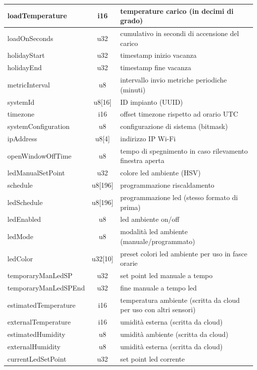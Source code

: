 \documentclass[12pt,a4paper,twoside,titlepage]{book}
\begin{document}
\begin{center}
\begin{longtable}{| p{5cm} | c | p{8cm} |}
    loadTemperature & i16 & temperature carico (in decimi di grado)\\ \hline
    loadOnSeconds & u32 & cumulativo in secondi di accensione del carico\\ \hline
    holidayStart & u32 & timestamp inizio vacanza\\ \hline
    holidayEnd & u32 & timestamp fine vacanza\\ \hline
    metricInterval & u8 & intervallo invio metriche periodiche (minuti)\\ \hline
    systemId & u8[16] & ID impianto (UUID)\\ \hline
    timezone & i16 & offset timezone rispetto ad orario UTC\\ \hline
    systemConfiguration & u8 & configurazione di sistema (bitmask)\\ \hline
    ipAddress & u8[4] & indirizzo IP Wi-Fi\\ \hline
    openWindowOffTime & u8 & tempo di spegnimento in caso rilevamento finestra aperta\\ \hline
    ledManualSetPoint & u32 & colore \acrshort{led} ambiente (HSV)\\ \hline
    schedule & u8[196] & programmazione riscaldamento\\ \hline
    ledSchedule & u8[196] & programmazione \acrshort{led} (stesso formato di prima)\\ \hline
    ledEnabled & u8 & \acrshort{led} ambiente on/off\\ \hline
    ledMode & u8 & modalità led ambiente (manuale/programmato)\\ \hline
    ledColor & u32[10] & preset colori \acrshort{led} ambiente per uso in fasce orarie\\ \hline
    temporaryManLedSP & u32 & set point \acrshort{led} manuale a tempo\\ \hline
    temporaryManLedSPEnd & u32 & fine manuale a tempo \acrshort{led}\\ \hline
    estimatedTemperature & i16 &temperatura ambiente (scritta da cloud per uso con altri sensori)\\ \hline
    externalTemperature & i16 & umidità esterna (scritta da cloud)\\ \hline
    estimatedHumidity & u8 & umidità ambiente (scritta da cloud)\\ \hline
    externalHumidity & u8 & umidità esterna (scritta da cloud)\\ \hline
    currentLedSetPoint & u32 & set point \acrshort{led} corrente\\ \hline

\end{longtable}
\end{center}
\end{document}
